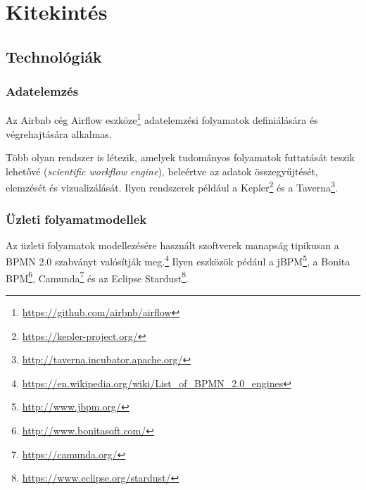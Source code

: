 
\section{Kitekintés\kieg}

%
%
%
%
%
%
%
%

\subsection{Technológiák}

\subsubsection{Adatelemzés}

Az Airbnb cég Airflow eszköze\footnote{\url{https://github.com/airbnb/airflow}} adatelemzési folyamatok definiálására és végrehajtására alkalmas.

Több olyan rendszer is létezik, amelyek tudományos folyamatok futtatását teszik lehetővé (\emph{scientific workflow engine}), beleértve az adatok összegyűjtését, elemzését és vizualizálását. Ilyen rendszerek például a
Kepler\footnote{\url{https://kepler-project.org/}} és a Taverna\footnote{\url{http://taverna.incubator.apache.org/}}.

\subsubsection{Üzleti folyamatmodellek}

Az üzleti folyamatok modellezésére használt szoftverek manapság tipikusan a BPMN 2.0 szabványt valósítják meg.\footnote{\url{https://en.wikipedia.org/wiki/List_of_BPMN_2.0_engines}}
Ilyen eszközök pédául a jBPM\footnote{\url{http://www.jbpm.org/}}, a Bonita BPM\footnote{\url{http://www.bonitasoft.com/}}, Camunda\footnote{\url{https://camunda.org/}} és az Eclipse Stardust\footnote{\url{https://www.eclipse.org/stardust/}}.
